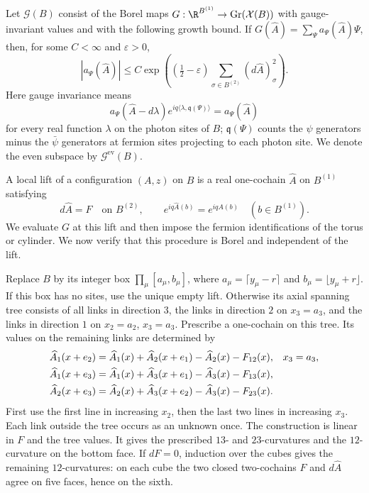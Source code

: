 Let $\mathcal G(B)$ consist of the Borel maps
$G:\R^{B^{(1)}}\to\operatorname{Gr}(\mathcal X(B))$ with gauge-invariant
values and with the following growth bound. If
$G(\widehat A)=\sum_\Psi a_\Psi(\widehat A)\Psi$, then, for some
$C<\infty$ and $\varepsilon>0$,
\begin{equation}\label{eq:slab-box-growth}
 |a_\Psi(\widehat A)|\le C
   \exp\left((\tfrac12-\varepsilon)
                    \sum_{\sigma\in B^{(2)}}(d\widehat A)_\sigma^2\right).
\end{equation}
Here gauge invariance means
\begin{equation}\label{eq:slab-box-gauge}
 a_\Psi(\widehat A-d\lambda)
        e^{iq\langle\lambda,\mathfrak q(\Psi)\rangle}
       =a_\Psi(\widehat A)
\end{equation}
for every real function $\lambda$ on the photon sites of $B$;
$\mathfrak q(\Psi)$ counts the $\psi$ generators minus the
$\bar\psi$ generators at fermion sites projecting to each photon site.
We denote the even subspace by $\mathcal G^{\mathrm{ev}}(B)$.

A local lift of a configuration $(A,z)$ on $B$ is a real one-cochain
$\widehat A$ on $B^{(1)}$ satisfying
\begin{equation}\label{eq:slab-local-lift}
 d\widehat A=F\quad\text{on }B^{(2)},\qquad
 e^{iq\widehat A(b)}=e^{iqA(b)}\quad(b\in B^{(1)}).
\end{equation}
We evaluate $G$ at this lift and then impose the fermion identifications
of the torus or cylinder. We now verify that this procedure is Borel
and independent of the lift.

Replace $B$ by its integer box
$\prod_\mu[a_\mu,b_\mu]$, where $a_\mu=\lceil y_\mu-r\rceil$ and
$b_\mu=\lfloor y_\mu+r\rfloor$. If this box has no sites, use the
unique empty lift. Otherwise its axial spanning tree consists of all
links in direction $3$, the links in direction $2$ on $x_3=a_3$, and the
links in direction $1$ on $x_2=a_2$, $x_3=a_3$. Prescribe a one-cochain
on this tree. Its values on the remaining links are determined by
\begin{align}\label{eq:slab-lift-recursion}
 \widehat A_1(x+e_2)&=\widehat A_1(x)+\widehat A_2(x+e_1)
                                  -\widehat A_2(x)-F_{12}(x),
                                  &&x_3=a_3,\notag\\
 \widehat A_1(x+e_3)&=\widehat A_1(x)+\widehat A_3(x+e_1)
                                  -\widehat A_3(x)-F_{13}(x),\\
 \widehat A_2(x+e_3)&=\widehat A_2(x)+\widehat A_3(x+e_2)
                                  -\widehat A_3(x)-F_{23}(x).\notag
\end{align}
First use the first line in increasing $x_2$, then the last two lines
in increasing $x_3$. Each link outside the tree occurs as an unknown
once. The construction is linear in $F$ and the tree values. It gives
the prescribed $13$- and $23$-curvatures and the $12$-curvature on the
bottom face. If $dF=0$, induction over the cubes gives the remaining
$12$-curvatures: on each cube the two closed two-cochains $F$ and
$d\widehat A$ agree on five faces, hence on the sixth.

